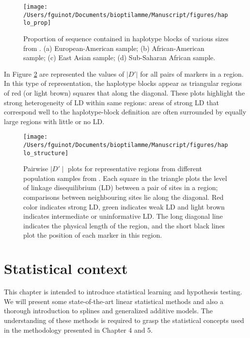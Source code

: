 \documentclass[]{book}
\begin{document}
\begin{figure}

{\centering \texttt{[image: /Users/fguinot/Documents/bioptilamme/Manuscript/figures/haplo\_prop]} 

}

\caption{Proportion of sequence contained in haplotype blocks of various sizes from \citep{wall2003haplotype}. (a) European-American sample; (b) African-American sample; (c) East Asian sample; (d) Sub-Saharan African sample.}\label{fig:haploprop}
\end{figure}

In Figure \ref{fig:haplostructure} are represented the values of \(|D'|\)
for all pairs of markers in a region. In this type of representation,
the haplotype blocks appear as triangular regions of red (or light
brown) squares that along the diagonal. These plots highlight the strong
heterogeneity of LD within same regions: areas of strong LD that
correspond well to the haplotype-block definition are often surrounded
by equally large regions with little or no LD.



\begin{figure}

{\centering \texttt{[image: /Users/fguinot/Documents/bioptilamme/Manuscript/figures/haplo\_structure]} 

}

\caption{Pairwise \(\mid D' \mid\) plots for representative regions from different population samples from \citep{wall2003haplotype}. Each square in the triangle plots the level of linkage disequilibrium (LD) between a pair of sites in a region; comparisons between neighbouring sites lie along the diagonal. Red color indicates strong LD, green indicates weak LD and light brown indicates intermediate or uninformative LD. The long diagonal line indicates the physical length of the region, and the short black lines plot the position of each marker in this region.}\label{fig:haplostructure}
\end{figure}

\hypertarget{statistical-context}{%
\chapter{Statistical context}\label{statistical-context}}

This chapter is intended to introduce statistical learning and hypothesis testing. We will present some state-of-the-art linear statistical methods and also a thorough introduction to splines and generalized additive models. The understanding of these methods is required to grasp the statistical concepts used in the methodology presented in Chapter 4 and 5.
\end{document}
